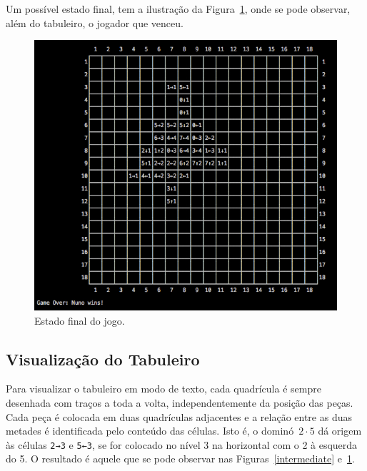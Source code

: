 \documentclass[a4paper]{article}
\begin{document}
Um possível estado final, tem a ilustração da Figura~\ref{over}, onde se pode observar, além do tabuleiro, o jogador que venceu.

\begin{figure}[htbp]
\begin{center}
\includegraphics[scale=0.6]{final.jpg}
\caption{Estado final do jogo.}
\label{over}
\end{center}
\end{figure}


\subsection{Visualização do Tabuleiro}
 
Para visualizar o tabuleiro em modo de texto, cada quadrícula é sempre desenhada com traços a toda a volta, independentemente da posição das peças. Cada peça é colocada em duas quadrículas adjacentes e a relação entre as duas metades é identificada pelo conteúdo das células. Isto é, o dominó~$2 \cdot 5$ dá origem às células \verb|2→3| e \verb|5←3|, se for colocado no nível 3 na horizontal com o 2 à esquerda do 5. O resultado é aquele que se pode observar nas Figuras~\ref{intermediate} e~\ref{over}.
\end{document}
